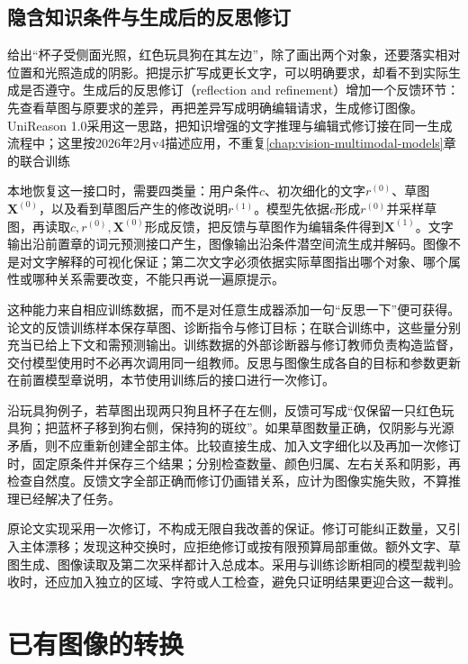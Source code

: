 \subsection{隐含知识条件与生成后的反思修订}
\label{sec:vision-generation-unireason-refinement}

给出“杯子受侧面光照，红色玩具狗在其左边”，除了画出两个对象，还要落实相对位置和光照造成的阴影。把提示扩写成更长文字，可以明确要求，却看不到实际生成是否遵守。生成后的反思修订（reflection and refinement）增加一个反馈环节：先查看草图与原要求的差异，再把差异写成明确编辑请求，生成修订图像。UniReason 1.0采用这一思路，把知识增强的文字推理与编辑式修订接在同一生成流程中；这里按2026年2月v4描述应用，不重复\ref{chap:vision-multimodal-models}章的联合训练

本地恢复这一接口时，需要四类量：用户条件$c$、初次细化的文字$r^{(0)}$、草图$\bm{X}^{(0)}$，以及看到草图后产生的修改说明$r^{(1)}$。模型先依据$c$形成$r^{(0)}$并采样草图，再读取$c,r^{(0)},\bm{X}^{(0)}$形成反馈，把反馈与草图作为编辑条件得到$\bm{X}^{(1)}$。文字输出沿前置章的词元预测接口产生，图像输出沿条件潜空间流生成并解码。图像不是对文字解释的可视化保证；第二次文字必须依据实际草图指出哪个对象、哪个属性或哪种关系需要改变，不能只再说一遍原提示。

这种能力来自相应训练数据，而不是对任意生成器添加一句“反思一下”便可获得。论文的反馈训练样本保存草图、诊断指令与修订目标；在联合训练中，这些量分别充当已给上下文和需预测输出。训练数据的外部诊断器与修订教师负责构造监督，交付模型使用时不必再次调用同一组教师。反思与图像生成各自的目标和参数更新在前置模型章说明，本节使用训练后的接口进行一次修订。

沿玩具狗例子，若草图出现两只狗且杯子在左侧，反馈可写成“仅保留一只红色玩具狗；把蓝杯子移到狗右侧，保持狗的斑纹”。如果草图数量正确，仅阴影与光源矛盾，则不应重新创建全部主体。比较直接生成、加入文字细化以及再加一次修订时，固定原条件并保存三个结果；分别检查数量、颜色归属、左右关系和阴影，再检查自然度。反馈文字全部正确而修订仍画错关系，应计为图像实施失败，不算推理已经解决了任务。

原论文实现采用一次修订，不构成无限自我改善的保证。修订可能纠正数量，又引入主体漂移；发现这种交换时，应拒绝修订或按有限预算局部重做。额外文字、草图生成、图像读取及第二次采样都计入总成本。采用与训练诊断相同的模型裁判验收时，还应加入独立的区域、字符或人工检查，避免只证明结果更迎合这一裁判。

\section{已有图像的转换}
\label{sec:vision-generation-translation}

